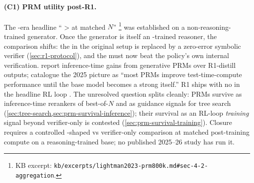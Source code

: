 \paragraph{(C1) PRM utility post-R1.}
The -era headline `` >  at matched $N$''
\citep[\S 4]{lightman2023-prm800k}\footnote{KB excerpt:
\nolinkurl{kb/excerpts/lightman2023-prm800k.md#sec-4-2-aggregation}.} was
established on a non-reasoning-trained generator. Once the generator is
itself an -trained reasoner, the comparison shifts: the  in the
original setup is replaced by a zero-error symbolic verifier
(\cref{sec:r1-protocol}), and the  must now beat the policy's own
internal verification.  report inference-time gains
from generative PRMs over R1-distill outputs;
\citet{zheng2025-prm-survey} catalogue the 2025 picture as ``most PRMs
improve test-time-compute performance until the base model becomes a
strong  itself.'' R1 ships with no  in the headline
RL loop \citep[\S 2.2]{deepseek-r1}. The unresolved question splits
cleanly: PRMs survive as inference-time rerankers of best-of-$N$ and as
guidance signals for tree search (\cref{sec:tree-search,sec:prm-survival-inference});
their survival as an RL-loop \emph{training} signal beyond
verifier-only  is contested
(\cref{sec:prm-survival-training}). Closure requires a controlled
-shaped  vs verifier-only  comparison at matched
post-training compute on a reasoning-trained base; no published 2025--26
study has run it.

